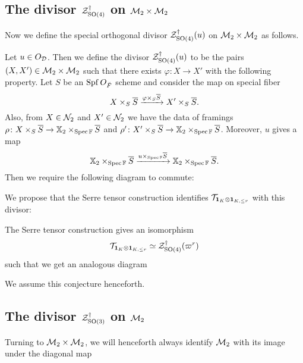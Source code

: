 \subsection{The divisor $\mathcal Z^{\dagger}_{\operatorname{SO}(4)}$ on $\mathcal M_2 \times \mathcal M_2$}
Now we define the special orthogonal divisor $\ZO4(u)$
on $\mathcal M_2 \times \mathcal M_2$ as follows.
\begin{definition}
  [$\ZO4(u)$]
  Let $u \in O_\mathcal D$.
  Then we define the divisor $\ZO4(u)$ to be the pairs $(X, X') \in \mathcal M_2 \times \mathcal M_2$
  such that there exists $\varphi \colon X \to X'$ with the following property.
  Let $S$ be an $\operatorname{Spf} O_{\breve F}$ scheme and consider the map on special fiber
  \[ X \times_S \overline S \xrightarrow{\varphi \times_S \overline S} X' \times_S \overline S. \]
  Also, from $X \in \mathcal N_2$ and $X' \in \mathcal N_2$ we have the data of framings
  $\rho \colon X \times_S \overline S \to \mathbb X_2 \times_{\operatorname{Spec} \mathbb F} \overline S$
  and $\rho' \colon X' \times_S \overline S \to \mathbb X_2 \times_{\operatorname{Spec} \mathbb F} \overline S$.
  Moreover, $u$ gives a map
  \[
    \mathbb X_2 \times_{\operatorname{Spec} \mathbb F} \overline S
    \xrightarrow{u \times _{\operatorname{Spec} \mathbb F} \overline S}
    \mathbb X_2 \times_{\operatorname{Spec} \mathbb F} \overline S.
  \]
  Then we require the following diagram to commute:
  \begin{center}
  \end{center}
\end{definition}
We propose that the Serre tensor construction identifies $\mathcal{T}_{\mathbf{1}_K \otimes \mathbf{1}_{K, \le r}}$ with this divisor:
\begin{conjecture}
  \label{conj:serre_pullback_space}
  The Serre tensor construction gives an isomorphism
  \[ \mathcal{T}_{\mathbf{1}_K \otimes \mathbf{1}_{K, \le r}} \simeq \mathcal Z^{\dagger}_{\operatorname{SO}(4)}(\varpi^r) \]
  such that we get an analogous diagram
  \begin{center}
  \end{center}
\end{conjecture}
We assume this conjecture henceforth.

\subsection{The divisor $\mathcal Z^{\dagger}_{\operatorname{SO}(3)}$ on $\mathcal M_2$}
Turning to $\mathcal M_2 \times \mathcal M_2$, we will henceforth always identify $\mathcal M_2$
with its image under the diagonal map
\begin{center}
\end{center}


